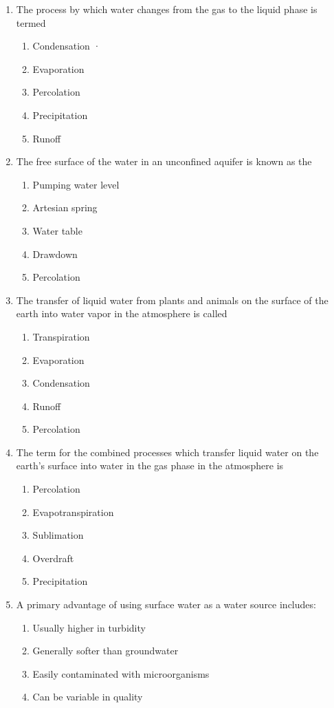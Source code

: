 \documentclass{article}
\begin{document}
\begin{enumerate}
\item The process by which water changes from the gas to the liquid phase is termed
\begin{enumerate}
\item Condensation	·
\item Evaporation
\item Percolation
\item Precipitation
\item Runoff
\end{enumerate}

\item The free surface of the water in an unconfined aquifer is known as the
\begin{enumerate}
\item Pumping water level
\item Artesian spring
\item Water table
\item Drawdown
\item Percolation
\end{enumerate}

\item The transfer of liquid water from plants and animals on the surface of the earth into water vapor in the atmosphere is called
\begin{enumerate}
\item Transpiration
\item Evaporation
\item Condensation
\item Runoff
\item Percolation
\end{enumerate}

\item The term for the combined processes which transfer liquid water on the earth's surface into water in the gas phase in the atmosphere is
\begin{enumerate}
\item Percolation
\item Evapotranspiration
\item Sublimation
\item Overdraft
\item Precipitation
\end{enumerate}

\item A primary advantage of using surface water as a water source includes:
\begin{enumerate}
\item Usually higher in turbidity
\item Generally softer than groundwater
\item Easily contaminated with microorganisms
\item Can be variable in quality
\end{enumerate}


\end{enumerate}
\end{document}
